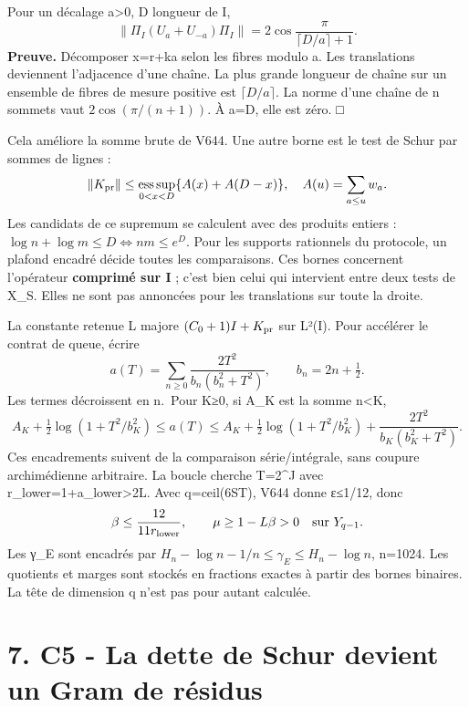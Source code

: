 \documentclass[
  10pt,
  a4paper,
]{article}
\begin{document}
Pour un décalage a\textgreater0, D longueur de I, \[
\|\Pi_I(U_a+U_{-a})\Pi_I\|
=2\cos\frac\pi{\lceil D/a\rceil+1}.
\] \textbf{Preuve.} Décomposer x=r+ka selon les fibres modulo a. Les
translations deviennent l'adjacence d'une chaîne. La plus grande
longueur de chaîne sur un ensemble de fibres de mesure positive est
\(\lceil D/a\rceil\). La norme d'une chaîne de n sommets vaut
\(2\cos(\pi/(n+1))\). À a=D, elle est zéro. □

Cela améliore la somme brute de V644. Une autre borne est le test de
Schur par sommes de lignes : \[
\|K_{\rm pr}\|\le\operatorname*{ess\,sup}_{0<x<D}
\{A(x)+A(D-x)\},\quad A(u)=\sum_{a\le u}w_a.
\] Les candidats de ce supremum se calculent avec des produits entiers :
\(\log n+\log m\le D\iff nm\le e^D\). Pour les supports rationnels du
protocole, un plafond encadré décide toutes les comparaisons. Ces bornes
concernent l'opérateur \textbf{comprimé sur I} ; c'est bien celui qui
intervient entre deux tests de X\_S. Elles ne sont pas annoncées pour
les translations sur toute la droite.

La constante retenue L majore \((C_0+1)I+K_{\rm pr}\) sur L²(I). Pour
accélérer le contrat de queue, écrire \[
a(T)=\sum_{n\ge0}\frac{2T^2}{b_n(b_n^2+T^2)},\qquad b_n=2n+\tfrac12.
\] Les termes décroissent en n.~Pour K≥0, si A\_K est la somme
n\textless K, \[
A_K+\tfrac12\log(1+T^2/b_K^2)
\le a(T)\le A_K+\tfrac12\log(1+T^2/b_K^2)
+\frac{2T^2}{b_K(b_K^2+T^2)}.
\] Ces encadrements suivent de la comparaison série/intégrale, sans
coupure archimédienne arbitraire. La boucle cherche T=2\^{}J avec
r\_lower=1+a\_lower\textgreater2L. Avec q=ceil(6ST), V644 donne ε≤1/12,
donc \[
\beta\le\frac{12}{11r_{\rm lower}},\qquad
\mu\ge1-L\beta>0\quad\text{sur }Y_{q-1}.
\] Les γ\_E sont encadrés par
\(H_n-\log n-1/n\le\gamma_E\le H_n-\log n\), n=1024. Les quotients et
marges sont stockés en fractions exactes à partir des bornes binaires.
La tête de dimension q n'est pas pour autant calculée.

\hypertarget{c5---la-dette-de-schur-devient-un-gram-de-ruxe9sidus}{%
\section{7. C5 - La dette de Schur devient un Gram de
résidus}\label{c5---la-dette-de-schur-devient-un-gram-de-ruxe9sidus}}
\end{document}
